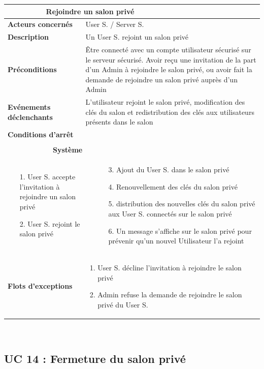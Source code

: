 \documentclass[a4paper,11pt,french]{article}
\newcommand{\fiche}[9] {
	\noindent
\begin{tabular}{|p{3.5cm}| p{1cm} | p{3cm} | p{.5cm} | p{7cm}|} 
\hline
\rowcolor{blue}
\multicolumn{2}{|l|}{\color{white}\bfseries{Nom}} & \multicolumn{3}{l|}{\color{white}\bfseries{#1}}\\
\hline
\multicolumn{2}{|l|}{\bfseries{Acteurs concernés}} & \multicolumn{3}{m{10.5cm}|}{#2}\\
\hline
\multicolumn{2}{|l|}{\bfseries{Description}} & \multicolumn{3}{m{10.5cm}|}{#3}\\
\hline
\multicolumn{2}{|l|}{\bfseries{Préconditions}} & \multicolumn{3}{m{10.5cm}|}{#4}\\
\hline
\multicolumn{2}{|l|}{\bfseries{Evénements déclenchants}} & \multicolumn{3}{m{10.5cm}|}{#5}\\
\hline
\multicolumn{2}{|l|}{\bfseries{Conditions d'arrêt}} & \multicolumn{3}{m{10.5cm}|}{#6}\\
\hline
\rowcolor{gray}
\multicolumn{5}{|c|}{\bfseries{Description du flot d'événements principal}}\\
\hline
\rowcolor{gray}
\multicolumn{3}{|c|}{\bfseries{Acteur(s)}} & \multicolumn{2}{c|}{\bfseries{Système}}\\
\hline
\multicolumn{3}{|p{7.5cm}|}{#7} & \multicolumn{2}{p{7.5cm}|}{#8}\\
\hline
\multicolumn{2}{|l}{\bfseries{Flots d'exceptions}} & \multicolumn{3}{|p{11.5cm}|}{#9}\\
\hline
\end{tabular}
\\
}
\begin{document}
\fiche
	{Rejoindre un salon privé} %
	{User S. / Server S.} %
	{Un User S. rejoint un salon privé  } %
	{Être connecté avec un compte utilisateur  sécurisé sur le serveur sécurisé.
Avoir reçu une invitation de la part d’un Admin à rejoindre le salon privé, ou avoir fait la demande de rejoindre un salon privé auprès d’un Admin} %
	{L’utilisateur rejoint le salon privé, modification des clés du salon et redistribution des clés aux utilisateurs présents dans le salon} %
	{} %
	{\begin{itemize}  %
		\item [1.] User S. accepte l’invitation à rejoindre un salon privé
		\item [2.] User S. rejoint le salon privé
	 \end{itemize}
	} 
	{\begin{itemize}  %
		\item []
		\item []
		\item []
		\item [3.] Ajout du User S. dans le salon privé
		\item [4.] Renouvellement des clés du salon privé
		\item [5.] distribution des nouvelles clés du salon privé aux User S. connectés sur le salon privé
		\item [6.] Un message s’affiche sur le salon privé pour prévenir qu’un nouvel Utilisateur l’a rejoint
	 \end{itemize}
	 }
	{\begin{enumerate}
		\item User S. décline l’invitation à rejoindre le salon privé
		\item Admin refuse la demande de rejoindre le salon privé du User S. 
	\end{enumerate}} %


\subsection{UC 14 : Fermeture du salon privé}
\end{document}
